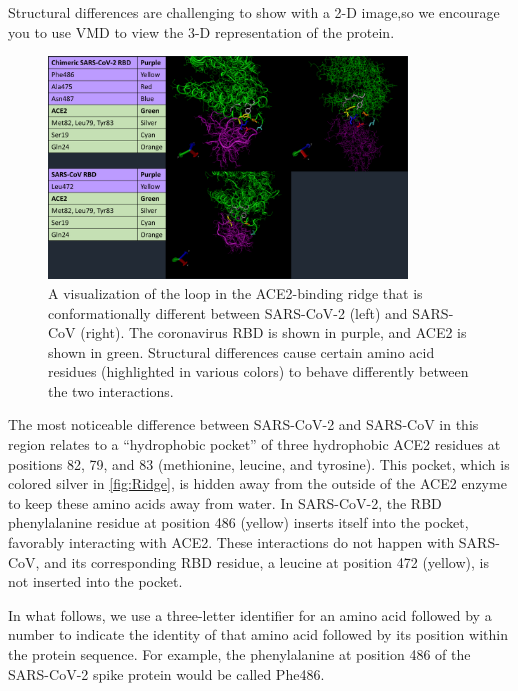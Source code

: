 Structural differences are challenging to show with a 2-D image,so we encourage you to use VMD to view the 3-D representation of the protein. \\

\begin{qbox}\end{qbox}

\begin{figure}[h]
	\centering
	\mySfFamily
	\includegraphics[width = 0.85\textwidth]{../images/Ridge.png}
	\caption{A visualization of the loop in the ACE2-binding ridge that is conformationally different between SARS-CoV-2 (left) and SARS-CoV (right). The coronavirus RBD is shown in purple, and ACE2 is shown in green. Structural differences cause certain amino acid residues (highlighted in various colors) to behave differently between the two interactions.}
	\label{fig:Ridge}
\end{figure}

The most noticeable difference between SARS-CoV-2 and SARS-CoV in this region relates to a ``hydrophobic pocket'' of three hydrophobic ACE2 residues at positions 82, 79, and 83 (methionine, leucine, and tyrosine). This pocket, which is colored silver in \autoref{fig:Ridge}, is hidden away from the outside of the ACE2 enzyme to keep these amino acids away from water. In SARS-CoV-2, the RBD phenylalanine residue at position 486 (yellow) inserts itself into the pocket, favorably interacting with ACE2. These interactions do not happen with SARS-CoV, and its corresponding RBD residue, a leucine at position 472 (yellow), is not inserted into the pocket.

In what follows, we use a three-letter identifier for an amino acid followed by a number to indicate the identity of that amino acid followed by its position within the protein sequence. For example, the phenylalanine at position 486 of the SARS-CoV-2 spike protein would be called Phe486.

